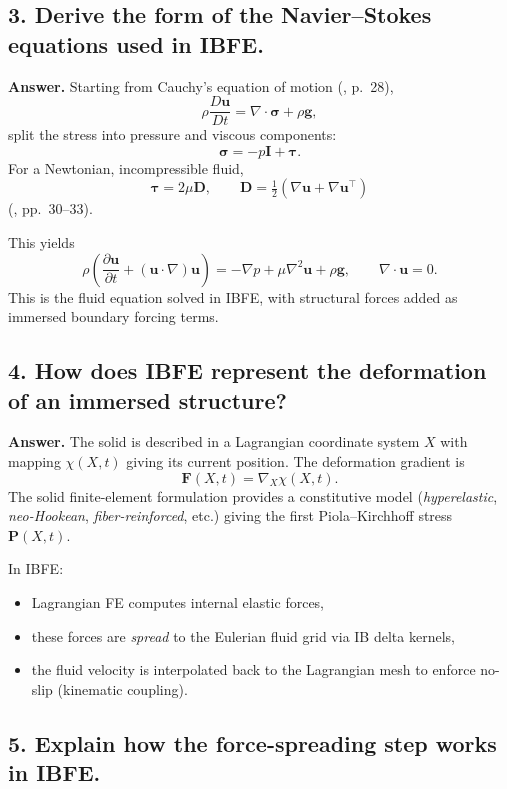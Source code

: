 \documentclass[12pt]{article}
\begin{document}
\subsection*{3. Derive the form of the Navier--Stokes equations used in IBFE.}

\textbf{Answer.}
Starting from Cauchy’s equation of motion (\cite{file:turn4file0}, p.\ 28),
\[
\rho\frac{D\mathbf{u}}{Dt} = \nabla\cdot\boldsymbol{\sigma} + \rho\mathbf{g},
\]
split the stress into pressure and viscous components:
\[
\boldsymbol{\sigma} = -p\mathbf{I} + \boldsymbol{\tau}.
\]
For a Newtonian, incompressible fluid,
\[
\boldsymbol{\tau} = 2\mu \mathbf{D},
\qquad
\mathbf{D} = \tfrac{1}{2}(\nabla \mathbf{u} + \nabla \mathbf{u}^\top)
\]
(\cite{file:turn4file0}, pp.\ 30–33).

This yields
\[
\rho\left( \frac{\partial \mathbf{u}}{\partial t}
+ (\mathbf{u}\cdot\nabla)\mathbf{u} \right)
= -\nabla p + \mu \nabla^2 \mathbf{u} + \rho \mathbf{g},
\qquad 
\nabla\cdot \mathbf{u} = 0.
\]
This is the fluid equation solved in IBFE, with structural forces added as
immersed boundary forcing terms.

\subsection*{4. How does IBFE represent the deformation of an immersed structure?}

\textbf{Answer.}
The solid is described in a Lagrangian coordinate system $X$ with mapping
$\chi(X,t)$ giving its current position.  
The deformation gradient is
\[
\mathbf{F}(X,t) = \nabla_X \chi(X,t).
\]
The solid finite-element formulation provides a constitutive model
(\emph{hyperelastic}, \emph{neo-Hookean}, \emph{fiber-reinforced}, etc.) giving
the first Piola--Kirchhoff stress $\mathbf{P}(X,t)$.

In IBFE:
\begin{itemize}
    \item Lagrangian FE computes internal elastic forces,
    \item these forces are \emph{spread} to the Eulerian fluid grid via IB
          delta kernels,
    \item the fluid velocity is interpolated back to the Lagrangian mesh to
          enforce no-slip (kinematic coupling).
\end{itemize}

\subsection*{5. Explain how the force-spreading step works in IBFE.}
\end{document}
